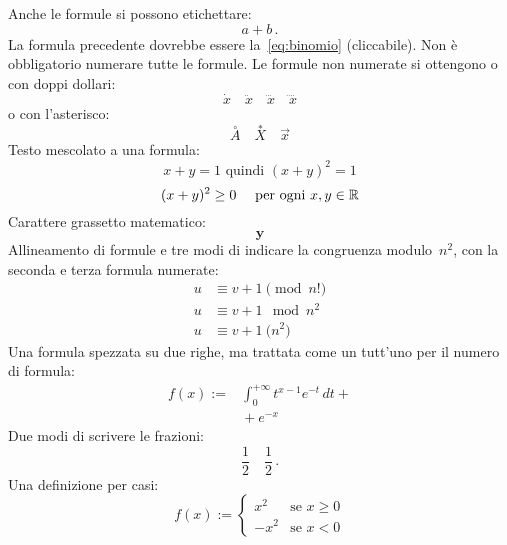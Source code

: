 Anche le formule si possono etichettare:
\begin{equation}
  \label{eq:binomio}
  a+b\,.
\end{equation}
La formula precedente dovrebbe essere la~\ref{eq:binomio} (cliccabile). Non è obbligatorio numerare tutte le formule. Le formule non numerate si ottengono o con doppi dollari:
$$\dot x\quad
  \ddot x\quad
  \dddot x\quad
  \ddddot x$$
o con l'asterisco:
\begin{equation*}
  \overset{\circ}{A}\quad
  \overset{*}{X}\quad
  \vec{x}
\end{equation*}
Testo mescolato a una formula:
\begin{equation}
  x+y=1\text{ quindi }(x+y)^2=1
\end{equation}
$$(x+y)^2\ge0\quad\text{ per ogni }x,y\in\mathbb{R}$$
Carattere grassetto matematico:
$$\boldsymbol{y}
  $$
Allineamento di formule e tre modi di indicare la congruenza modulo~$n^2$, con la seconda e terza formula numerate:
\begin{align}
     u & \equiv  v+1 \pmod{n!}\nonumber \\
     u & \equiv v+1 \mod{n^2} \\
     u & \equiv v+1 \pod{n^2}
  \end{align}
Una formula spezzata su due righe, ma trattata come un tutt'uno per il numero di formula:
\begin{equation}
  \begin{split}
    f(x)  :={}& \int_0^{+\infty}t^{x-1}e^{-t}\,dt+\\
         &{}+e^{-x}
  \end{split}
\end{equation}
Due modi di scrivere le frazioni:
\begin{equation}
  \frac{1}{2}
  \quad\frac{1}{2}\,.
  \end{equation}
Una definizione per casi:
\begin{equation}
  f(x):=
  \begin{cases}
    x^2 & \text{se } x\ge0 \\
   -x^2 & \text{se }x<0
  \end{cases}
\end{equation}
